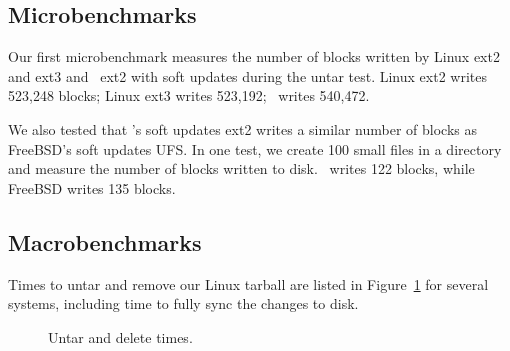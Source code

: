 \begin{comment}
\begin{figure}[t]
\vspace{-0.5\baselineskip}
\centering{
\texttt{[image: rb\_patch\_size]}
}
\vspace{-0.5\baselineskip}
\caption{\label{fig:patchsize-histo} \Rb\ \patch\ size histogram for a sample
workload (extracting a large archive into ext2). All the \patches\ larger than
63 bytes have been optimized into \nrb\ \patches. \Rb\ \patches\ 4 bytes and
smaller account for about 51\% of all \rb\ \patches.}
\end{figure}
\end{comment}

\subsection {Microbenchmarks}
Our first microbenchmark measures the number of blocks written by Linux ext2
and ext3 and \Kudos\ ext2 with soft updates during the untar test. Linux ext2
writes 523,248 blocks; Linux ext3 writes 523,192; \Kudos\ writes 540,472.

We also tested that \Kudos's soft updates ext2 writes a similar number of blocks as FreeBSD's
soft updates UFS. In one test, we create 100 small files in a directory and
measure the number of blocks written to disk. \Kudos\ writes 122 blocks,
while FreeBSD writes 135 blocks.

\subsection {Macrobenchmarks}
\label{sec:eval:macro}

\label{sec:eval:untardel}

Times to untar and remove our Linux tarball are listed in
Figure~\ref{fig:macro} for several systems, including time to fully sync
the changes to disk.

\begin{figure}[t]
\caption{\label{fig:macro} Untar and delete times.}
\end{figure}

